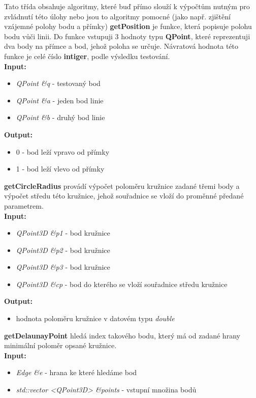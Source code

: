 \documentclass{article}
\begin{document}
Tato třída obsahuje algoritmy, které buď přímo slouží k výpočtům nutným pro zvládnutí této úlohy nebo jsou to algoritmy pomocné (jako např. zjištění vzájemné polohy bodu a přímky)
\bigskip
\textbf{getPosition} je funkce, která popisuje polohu bodu vůči linii. Do funkce vstupuji 3 hodnoty typu  \textbf{QPoint}, které reprezentuji dva body na přímce a bod, jehož poloha se určuje. Návratová hodnota této funkce je celé číslo \textbf{intiger}, podle výsledku testování.\\ 
 \textbf{Input:}
\begin{itemize} 
\item \textit{QPoint \&q} - testovaný bod
\item \textit{QPoint \&a} - jeden bod linie
\item \textit{QPoint \&b} - druhý bod linie
\end{itemize}
 \textbf{Output:}
\begin{itemize} 
\item 0 - bod leží vpravo od přímky
\item 1 - bod leží vlevo od přímky 
\end{itemize} 
\bigskip
\textbf{getCircleRadius} provádí výpočet poloměru kružnice zadané třemi body a výpočet středu této kružnice, jehož souřadnice se vloží do proměnné předané parametrem.\\
 \textbf{Input:}
\begin{itemize} 
\item \textit{QPoint3D \&p1} - bod kružnice
\item \textit{QPoint3D \&p2} - bod kružnice
\item \textit{QPoint3D \&p3} - bod kružnice
\item \textit{QPoint3D \&cp} - bod do kterého se vloží souřadnice středu kružnice
\end{itemize}
 \textbf{Output:}
\begin{itemize} 
\item hodnota poloměru kružnice v datovém typu \textit{double}
\end{itemize}
\bigskip
\textbf{getDelaunayPoint} hledá index takového bodu, který má od zadané hrany minimální poloměr opsané kružnice.\\
 \textbf{Input:}
\begin{itemize} 
\item \textit{Edge \&e} - hrana ke které hledáme bod
\item \textit{std::vector <QPoint3D> \&points} - vstupní množina bodů
\end{itemize}
\end{document}

